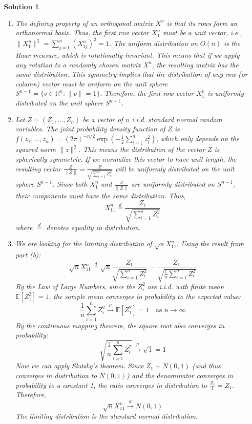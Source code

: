 \documentclass[12pt]{amsart}
\newtheorem*{solution}{Solution}
\begin{document}
\begin{solution}
\begin{enumerate}[label=(\alph*)]
\item The defining property of an orthogonal matrix $X^n$ is that its rows form an orthonormal basis. Thus, the first row vector $X_1^n$ must be a unit vector, i.e., $\|X_1^n\|^2 = \sum_{j=1}^n (X_{1j}^n)^2 = 1$. The uniform distribution on $O(n)$ is the Haar measure, which is rotationally invariant. This means that if we apply any rotation to a randomly chosen matrix $X^n$, the resulting matrix has the same distribution. This symmetry implies that the distribution of any row (or column) vector must be uniform on the unit sphere $S^{n-1} = \{v \in \mathbb{R}^n : \|v\|=1\}$. Therefore, the first row vector $X_1^n$ is uniformly distributed on the unit sphere $S^{n-1}$.

\item Let $Z = (Z_1, \ldots, Z_n)$ be a vector of $n$ i.i.d. standard normal random variables. The joint probability density function of $Z$ is $f(z_1, \ldots, z_n) = (2\pi)^{-n/2} \exp(-\frac{1}{2}\sum_{i=1}^n z_i^2)$, which only depends on the squared norm $\|z\|^2$. This means the distribution of the vector $Z$ is spherically symmetric. If we normalize this vector to have unit length, the resulting vector $\frac{Z}{\|Z\|} = \frac{Z}{\sqrt{\sum_{i=1}^n Z_i^2}}$ will be uniformly distributed on the unit sphere $S^{n-1}$.
Since both $X_1^n$ and $\frac{Z}{\|Z\|}$ are uniformly distributed on $S^{n-1}$, their components must have the same distribution. Thus,
$$ X_{11}^n \stackrel{d}{=} \frac{Z_1}{\sqrt{\sum_{i=1}^n Z_i^2}} $$
where $\stackrel{d}{=}$ denotes equality in distribution.

\item We are looking for the limiting distribution of $\sqrt{n} X_{11}^n$. Using the result from part (b):
$$ \sqrt{n} X_{11}^n \stackrel{d}{=} \sqrt{n} \frac{Z_1}{\sqrt{\sum_{i=1}^n Z_i^2}} = \frac{Z_1}{\sqrt{\frac{1}{n}\sum_{i=1}^n Z_i^2}} $$
By the Law of Large Numbers, since the $Z_i^2$ are i.i.d. with finite mean $\mathbb{E}[Z_1^2] = 1$, the sample mean converges in probability to the expected value:
$$ \frac{1}{n}\sum_{i=1}^n Z_i^2 \xrightarrow{p} \mathbb{E}[Z_1^2] = 1 \quad \text{as } n \to \infty $$
By the continuous mapping theorem, the square root also converges in probability:
$$ \sqrt{\frac{1}{n}\sum_{i=1}^n Z_i^2} \xrightarrow{p} \sqrt{1} = 1 $$
Now we can apply Slutsky's theorem. Since $Z_1 \sim N(0,1)$ (and thus converges in distribution to $N(0,1)$) and the denominator converges in probability to a constant 1, the ratio converges in distribution to $\frac{Z_1}{1} = Z_1$.
Therefore,
$$ \sqrt{n} X_{11}^n \xrightarrow{d} N(0,1) $$
The limiting distribution is the standard normal distribution.
\end{enumerate}
\end{solution}
\end{document}
